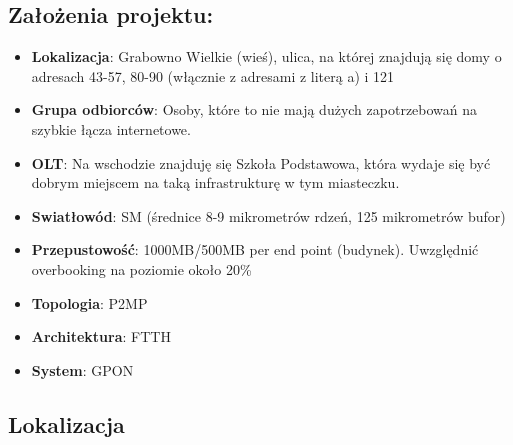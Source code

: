\subsection{Założenia projektu:}
\begin{itemize}
	\item \textbf{Lokalizacja}: Grabowno Wielkie (wieś), ulica, na której znajdują się domy o adresach 43-57, 80-90 (włącznie z adresami z literą a) i 121
	\item \textbf{Grupa odbiorców}: Osoby, które to nie mają dużych zapotrzebowań na szybkie łącza internetowe.
	\item \textbf{OLT}: Na wschodzie znajduję się Szkoła Podstawowa, która wydaje się być dobrym miejscem na taką infrastrukturę w tym miasteczku.
	\item \textbf{Swiatłowód}: SM (średnice 8-9 mikrometrów rdzeń, 125 mikrometrów bufor)
	\item \textbf{Przepustowość}: 1000MB/500MB per end point (budynek). Uwzględnić overbooking na poziomie około 20\%
	\item \textbf{Topologia}: P2MP
	\item \textbf{Architektura}: FTTH
	\item \textbf{System}: GPON
\end{itemize}

\newpage
\subsection{Lokalizacja}

